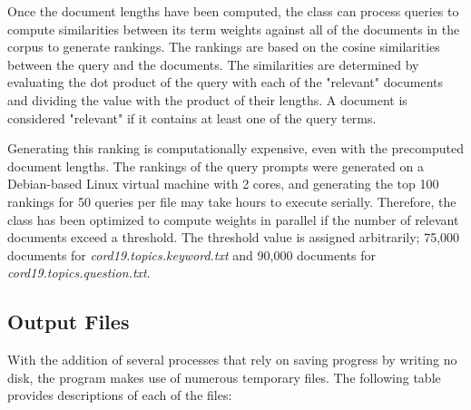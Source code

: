 \documentclass[11pt]{article}
\begin{document}
Once the document lengths have been computed, the class can process queries to compute similarities between its term weights against all of the documents in the corpus to generate rankings. The rankings are based on the cosine similarities between the query and the documents. The similarities are determined by evaluating the dot product of the query with each of the "relevant" documents and dividing the value with the product of their lengths. A document is considered "relevant" if it contains at least one of the query terms.

Generating this ranking is computationally expensive, even with the precomputed document lengths. The rankings of the query prompts were generated on a Debian-based Linux virtual machine with 2 cores, and generating the top 100 rankings for 50 queries per file may take hours to execute serially. Therefore, the class has been optimized to compute weights in parallel if the number of relevant documents exceed a threshold. The threshold value is assigned arbitrarily; 75,000 documents for \textit{cord19.topics.keyword.txt} and 90,000 documents for \textit{cord19.topics.question.txt}.

\subsection{Output Files}
With the addition of several processes that rely on saving progress by writing no disk, the program makes use of numerous temporary files. The following table provides descriptions of each of the files:
\end{document}
